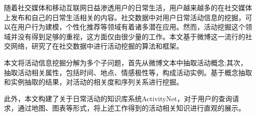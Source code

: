 
 

\makeatletter
\ifthu@bachelor\relax\else
  \ifthu@doctor
  \else
    \ifthu@master
    \fi
  \fi
\fi
\makeatother






\begin{cabstract}
随着社交媒体和移动互联网日益渗透用户的日常生活，用户越来越多的在社交媒体上发布和自己的日常生活相关的内容。社交数据中对用户日常活动信息的挖掘，可以在用户行为建模，个性化推荐等领域有着诸多潜在应用。然而，活动挖掘这个领域并没有得到足够的重视，这方面仅由很少量的工作。本文基于微博这一流行的社交网络，研究了在社交数据中进行活动挖掘的算法和框架。

本文将活动信息挖掘分解为多个子问题，首先从微博文本中抽取活动概念;其次，抽取活动相关属性，包括时间、地点、情感极性等，构成活动实例。基于概念抽取和实例抽取的结果，对活动的相关度和序列关系进行挖掘。

此外，本文构建了关于日常活动的知识库系统ActivityNet，对于用户的查询请求，通过地图、图表等形式，将上述工作得到的活动相关知识进行直观的展示。
\end{cabstract}

